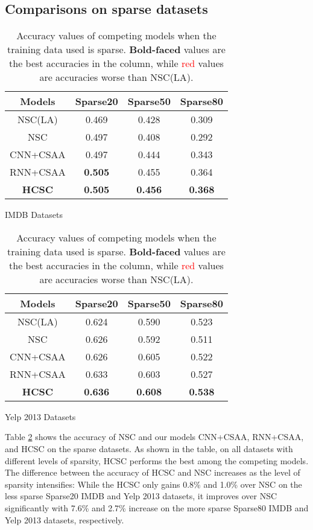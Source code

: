 \documentclass[11pt,a4paper]{article}
\begin{document}
\subsection{Comparisons on sparse datasets}

\begin{table}[t]
  \small
  \begin{subtable}{0.5\textwidth}
    \centering
    \begin{tabular}{|c|ccc|}
    \hline
    Models & Sparse20 & Sparse50 & Sparse80 \\
    \hline
    NSC(LA) & 0.469 & 0.428 & 0.309  \\
    NSC & 0.497 & \textcolor[rgb]{ 1,  0,  0}{0.408} & \textcolor[rgb]{ 1,  0,  0}{0.292} \\
    \hline
    CNN+CSAA & 0.497 & 0.444 & 0.343 \\
    RNN+CSAA & \textbf{0.505} & 0.455 & 0.364  \\
    \textbf{HCSC} & \textbf{0.505} & \textbf{0.456} & \textbf{0.368}   \\
    \hline
    \end{tabular}\caption{IMDB Datasets}
  \end{subtable}
  \begin{subtable}{0.5\textwidth}
    \centering
    \begin{tabular}{|c|ccc|}
    \hline
    Models & Sparse20 & Sparse50 & Sparse80\\
    \hline
    NSC(LA) & 0.624 & 0.590 & 0.523 \\
    NSC & 0.626 & 0.592 & \textcolor[rgb]{ 1,  0,  0}{0.511} \\
    \hline
    CNN+CSAA & 0.626 & 0.605 & 0.522  \\
    RNN+CSAA & 0.633 & 0.603 & 0.527  \\
    \textbf{HCSC} & \textbf{0.636} & \textbf{0.608} & \textbf{0.538}  \\
    \hline
    \end{tabular}\caption{Yelp 2013 Datasets}
  \end{subtable}
  \caption{Accuracy values of competing models when the training data used is sparse. \textbf{Bold-faced} values are the best accuracies in the column, while \textcolor{red}{red} values are accuracies worse than NSC(LA).}
  \label{tab:res_sparse}\end{table}

Table \ref{tab:res_sparse} shows the accuracy of NSC \cite{chen2016neural} and our models CNN+CSAA, RNN+CSAA, and HCSC on the sparse datasets. As shown in the table, on all datasets with different levels of sparsity, HCSC performs the best among the competing models. The difference between the accuracy of HCSC and NSC increases as the level of sparsity intensifies: While the HCSC only gains 0.8\% and 1.0\% over NSC on the less sparse Sparse20 IMDB and Yelp 2013 datasets, it improves over NSC significantly with 7.6\% and 2.7\% increase on the more sparse Sparse80 IMDB and Yelp 2013 datasets, respectively.
\end{document}
